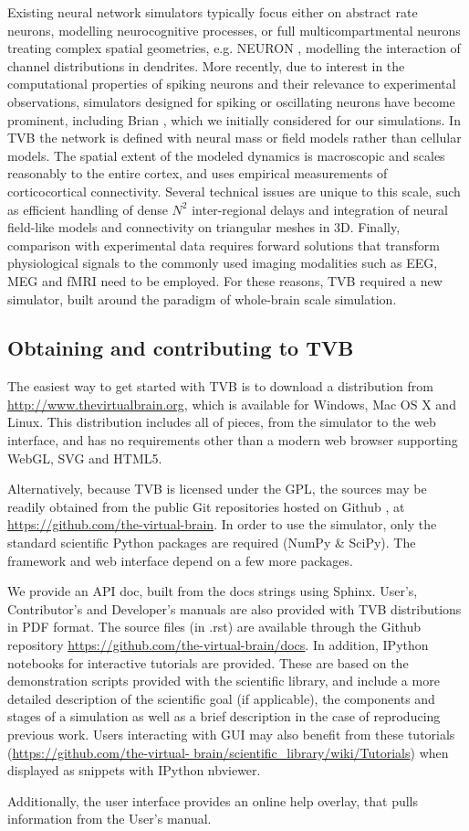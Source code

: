 Existing neural network simulators typically focus either on abstract rate neurons, 
modelling  neurocognitive processes, or 
full multicompartmental neurons treating complex spatial
geometries, e.g. NEURON \citep{Hines_2001}, modelling the interaction of 
channel distributions in dendrites.  More recently, due to interest in
the computational properties of spiking neurons and their relevance to
experimental observations, simulators designed for spiking or oscillating neurons
have become prominent, including Brian \citep{Goodman_2009}, which we initially 
considered for our simulations.
In TVB the network is defined with neural mass or field
models \citep{Deco_2008a, Coombes_2010} rather than cellular models. The
spatial extent of the modeled dynamics is macroscopic and scales reasonably 
to the entire cortex, and uses empirical measurements of corticocortical
connectivity. Several technical issues are unique to this scale, such
as efficient handling of dense $N^2$ inter-regional delays and integration
of neural field-like models and connectivity on triangular meshes in 3D.
Finally, comparison with experimental data requires forward solutions
that transform physiological signals to the commonly
used imaging modalities such as EEG, MEG and fMRI need to be employed.
For these reasons, TVB required a new simulator, built around the paradigm
of whole-brain scale simulation.

\subsection{Obtaining and contributing to TVB}

The easiest way to get started with TVB is to download a distribution
from \url{http://www.thevirtualbrain.org}, which is available for Windows,
Mac OS X and Linux. This distribution includes
all of pieces, from the simulator to the web interface, and has no
requirements other than a modern web browser supporting WebGL, SVG and
HTML5.

Alternatively, because TVB is licensed under the GPL, the sources may be
readily obtained from the public Git repositories hosted on Github
\citep{dabbish2012social}, at 
\url{https://github.com/the-virtual-brain}. In order to use the simulator, 
only the standard scientific Python packages are required (NumPy \& SciPy).
The framework and web interface depend on a few more packages. 

We provide an API doc, built from the docs strings using Sphinx.
User's, Contributor's and Developer's manuals are also provided with TVB
distributions in PDF format. The source files (in .rst) are available
through the Github repository \url{https://github.com/the-virtual-brain/docs}.  
In addition, IPython notebooks \citep{PerezGranger_2007}
for interactive tutorials are provided. These are based on the
demonstration scripts provided with the scientific library, and
include a more detailed description of the scientific goal (if
applicable), the components and stages of a simulation as well as a
brief description in the case of reproducing previous work. Users
interacting with \TVB GUI may also benefit from these tutorials
(\url{https://github.com/the-virtual-
brain/scientific_library/wiki/Tutorials}) when displayed as snippets
with IPython nbviewer. 

Additionally, the user interface provides an online help overlay, that pulls
information from the User's manual.


